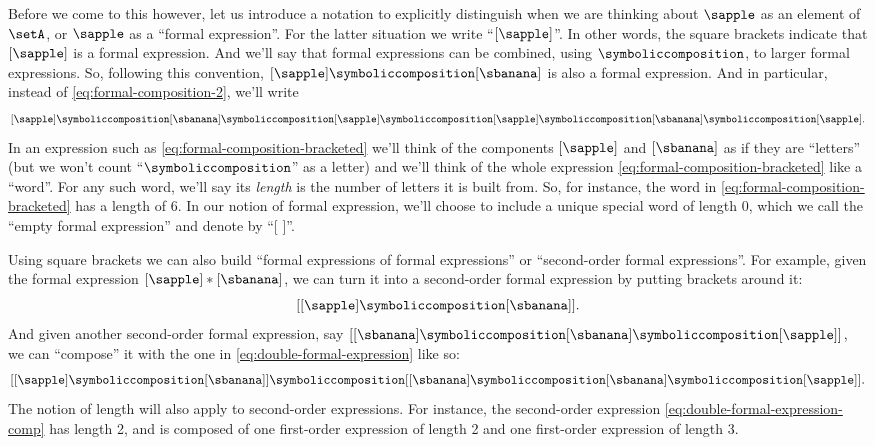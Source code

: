 Before we come to this however, let us introduce a notation to explicitly distinguish when we are thinking about $\sapple$ as an element of $\setA$, or $\sapple$ as a ``formal expression''.
For the latter situation we write ``$[\sapple]$''.
In other words, the square brackets indicate that $[\sapple]$ is a formal expression.
And we'll say that formal expressions can be combined, using $\symboliccomposition$, to larger formal expressions.
So, following this convention, $[\sapple] \symboliccomposition [\sbanana]$ is also a formal expression.
And in particular, instead of \cref{eq:formal-composition-2}, we'll write
\begin{equation}
    \label{eq:formal-composition-bracketed}
    [\sapple] \symboliccomposition [\sbanana] \symboliccomposition [\sapple] \symboliccomposition [\sapple] \symboliccomposition [\sbanana] \symboliccomposition [\sapple].
\end{equation}
%
In an expression such as \cref{eq:formal-composition-bracketed} we'll think of the components $[\sapple]$ and $[\sbanana]$ as if they are ``letters'' (but we won't count ``$\symboliccomposition$'' as a letter) and we'll think of the whole expression \cref{eq:formal-composition-bracketed} like a ``word''.
For any such word, we'll say its \emph{length} is the number of letters it is built from.
So, for instance, the word in \cref{eq:formal-composition-bracketed} has a length of $6$.
In our notion of formal expression, we'll choose to include a unique special word of length $0$, which we call the ``empty formal expression'' and denote by ``[ ]''.

Using square brackets we can also build ``formal expressions of formal expressions'' or ``second-order formal expressions''.
For example, given the formal expression $[\sapple] * [\sbanana]$, we can turn it into a second-order formal expression by putting brackets around it:
\begin{equation}
    \label{eq:double-formal-expression}
    [[\sapple] \symboliccomposition [\sbanana]].
\end{equation}
And given another second-order formal expression, say $[[\sbanana] \symboliccomposition [\sbanana] \symboliccomposition [\sapple]]$, we can ``compose'' it with the one in \cref{eq:double-formal-expression} like so:
\begin{equation}
    \label{eq:double-formal-expression-comp}
    [[\sapple] \symboliccomposition [\sbanana]] \symboliccomposition [[\sbanana] \symboliccomposition [\sbanana] \symboliccomposition [\sapple]].
\end{equation}
The notion of length will also apply to second-order expressions.
For instance, the second-order expression \cref{eq:double-formal-expression-comp} has length 2, and is composed of one first-order expression of length 2 and one first-order expression of length 3.

